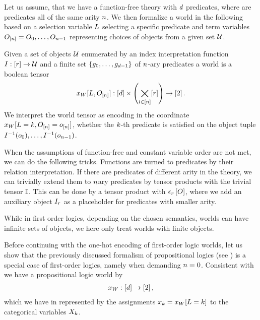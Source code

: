 Let us assume, that we have a function-free theory with $d$ predicates, where are predicates all of the same arity $n$.
We then formalize a world in the following based on a selection variable $L$ selecting a specific predicate and term variables $O_{[n]}=O_{0},\ldots,O_{n-1}$ representing choices of objects from a given set $\mathcal{U}$.

\begin{definition}
    \label{def:folWorld}
    Given a set of objects $\mathcal{U}$ enumerated by an index interpretation function $I:[r]\rightarrow \mathcal{U}$ and a finite set $\{g_{0},\ldots,g_{d-1}\}$ of $n$-ary predicates a world is a boolean tensor
    \begin{align}
        \dataworldwith : [\catorder] \times \left( \symindstates\right) \rightarrow [2] \, . %
    \end{align}
    We interpret the world tensor as encoding in the coordinate $x_{W}[L=k,O_{[n]}=o_{[n]}]$, whether the $k$-th predicate is satisfied on the object tuple $I^{-1}(o_{0}),\ldots,I^{-1}(o_{n-1})$.
\end{definition}


When the assumptions of function-free and constant variable order are not met, we can do the following tricks.
Functions are turned to predicates by their relation interpretation.
If there are predicates of different arity in the theory, we can trivially extend them to $n$ary predicates by tensor products with the trivial tensor $\mathbb{I}$.
This can be done by a tensor product with $\epsilon_{r}\left[O\right]$, where we add an auxiliary object $I_{r}$ as a placeholder for predicates with smaller arity.

While in first order logics, depending on the chosen semantics, worlds can have infinite sets of objects, we here only treat worlds with finite objects.


%
Before continuing with the one-hot encoding of first-order logic worlds, let us show that the previously discussed formalism of propositional logics (see ) is a special case of first-order logics, namely when demanding $n=0$.
Consistent with  we have a propositional logic world by
\begin{align*}
    x_{W}: [d] \rightarrow [2] \, ,
\end{align*}
which we have in  represented by the assignments $x_{k} = x_{W}[L=k]$ to the categorical variables $X_{k}$.

